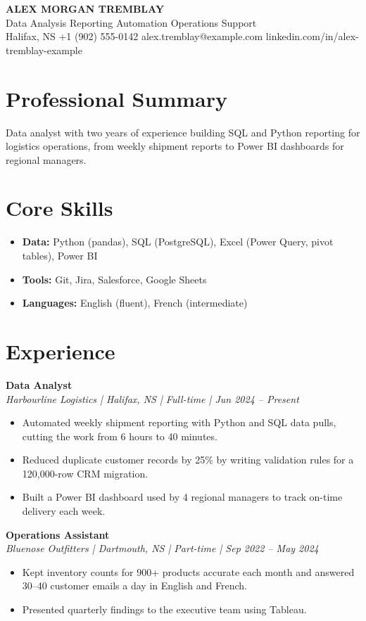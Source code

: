 \documentclass[11pt,letterpaper]{article}
\newcommand{\entry}[2]{\textbf{#1}\\\textit{#2}\par}
\begin{document}
\begin{center}
  {\LARGE\bfseries ALEX MORGAN TREMBLAY}\\[2pt]
  Data Analysis \textbar{} Reporting Automation \textbar{} Operations Support\\[2pt]
  Halifax, NS \textbar{} +1 (902) 555-0142 \textbar{} alex.tremblay@example.com \textbar{} linkedin.com/in/alex-tremblay-example
\end{center}

\section{Professional Summary}
Data analyst with two years of experience building SQL and Python reporting for logistics operations, from weekly
shipment reports to Power BI dashboards for regional managers.

\section{Core Skills}
\begin{itemize}
  \item \textbf{Data:} Python (pandas), SQL (PostgreSQL), Excel (Power Query, pivot tables), Power BI
  \item \textbf{Tools:} Git, Jira, Salesforce, Google Sheets
  \item \textbf{Languages:} English (fluent), French (intermediate)
\end{itemize}

\section{Experience}
\entry{Data Analyst}{Harbourline Logistics | Halifax, NS | Full-time | Jun 2024 -- Present}
\begin{itemize}
  \item Automated weekly shipment reporting with Python and SQL data pulls, cutting the work from 6 hours to 40 minutes.
  \item Reduced duplicate customer records by 25\% by writing validation rules for a 120,000-row CRM migration.
  \item Built a Power BI dashboard used by 4 regional managers to track on-time delivery each week.
\end{itemize}

\entry{Operations Assistant}{Bluenose Outfitters | Dartmouth, NS | Part-time | Sep 2022 -- May 2024}
\begin{itemize}
  \item Kept inventory counts for 900+ products accurate each month and answered 30--40 customer emails a day in English and French.
  \item Presented quarterly findings to the executive team using Tableau.
\end{itemize}
\end{document}
